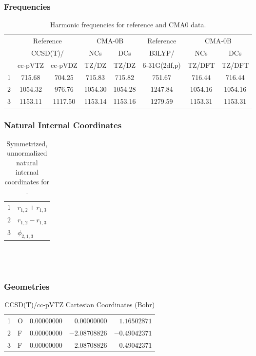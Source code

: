 \documentclass[10pt,oneside]{article}
\begin{document}
\clearpage

\subsubsection*{Frequencies}
\begin{table}[h!]
\centering
\caption{Harmonic frequencies for reference and CMA0 data.}
\begin{tabular}{cccccccc}
\toprule
{} & \multicolumn{2}{c}{Reference} & \multicolumn{2}{c}{CMA-0B} &    Reference & \multicolumn{2}{c}{CMA-0B} \\
{} & \multicolumn{2}{c}{CCSD(T)/} &     NCs &     DCs &       B3LYP/ &     NCs &     DCs \\
{} &   cc-pVTZ & cc-pVDZ &   TZ/DZ &   TZ/DZ & 6-31G(2df,p) &  TZ/DFT &  TZ/DFT \\
\midrule
1 &    715.68 &  704.25 &  715.83 &  715.82 &       751.67 &  716.44 &  716.44 \\
2 &   1054.32 &  976.76 & 1054.30 & 1054.28 &      1247.84 & 1054.16 & 1054.16 \\
3 &   1153.11 & 1117.50 & 1153.14 & 1153.16 &      1279.59 & 1153.31 & 1153.31 \\
\bottomrule
\end{tabular}
\end{table}

\clearpage

\subsubsection*{Natural Internal Coordinates}
\begin{table}[h!]
\centering
\caption{Symmetrized, unnormalized natural internal coordinates for .}
\small
\begin{tabular}{ll}
  1   & $r_{1,2} + r_{1,3}$ \\
  2   & $r_{1,2} - r_{1,3}$ \\
  3   & $\phi_{2,1,3}$ \\
\end{tabular}
\end{table}

\clearpage

\subsection{\ \ \ }

\subsubsection*{Geometries}
\begin{table}[h!]
\centering
\caption{CCSD(T)/cc-pVTZ Cartesian Coordinates (Bohr)}
\begin{tabular}{llrrr}
1  & O  & $ 0.00000000$ & $ 0.00000000$ & $ 1.16502871$ \\
2  & F  & $ 0.00000000$ & $-2.08708826$ & $-0.49042371$ \\
3  & F  & $ 0.00000000$ & $ 2.08708826$ & $-0.49042371$ \\
\end{tabular}
\end{table}
\end{document}
